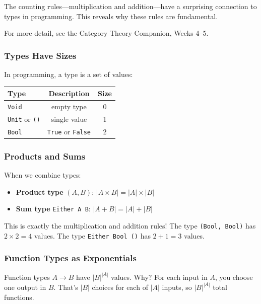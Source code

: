 \begin{goingdeeper}
The counting rules---multiplication and addition---have a surprising connection to types in programming. This reveals why these rules are fundamental.

For more detail, see the Category Theory Companion, Weeks 4--5.

\subsubsection*{Types Have Sizes}

In programming, a type is a set of values:
\begin{center}
\begin{tabular}{lcc}
\textbf{Type} & \textbf{Description} & \textbf{Size} \\
\hline
\texttt{Void} & empty type & 0 \\
\texttt{Unit} or \texttt{()} & single value & 1 \\
\texttt{Bool} & \texttt{True} or \texttt{False} & 2 \\
\end{tabular}
\end{center}

\subsubsection*{Products and Sums}

When we combine types:
\begin{itemize}
  \item \textbf{Product type} $(A, B)$: $|A \times B| = |A| \times |B|$
  \item \textbf{Sum type} \texttt{Either A B}: $|A + B| = |A| + |B|$
\end{itemize}

This is exactly the multiplication and addition rules! The type \texttt{(Bool, Bool)} has $2 \times 2 = 4$ values. The type \texttt{Either Bool ()} has $2 + 1 = 3$ values.

\subsubsection*{Function Types as Exponentials}

Function types $A \to B$ have $|B|^{|A|}$ values. Why? For each input in $A$, you choose one output in $B$. That's $|B|$ choices for each of $|A|$ inputs, so $|B|^{|A|}$ total functions.


\end{goingdeeper}
